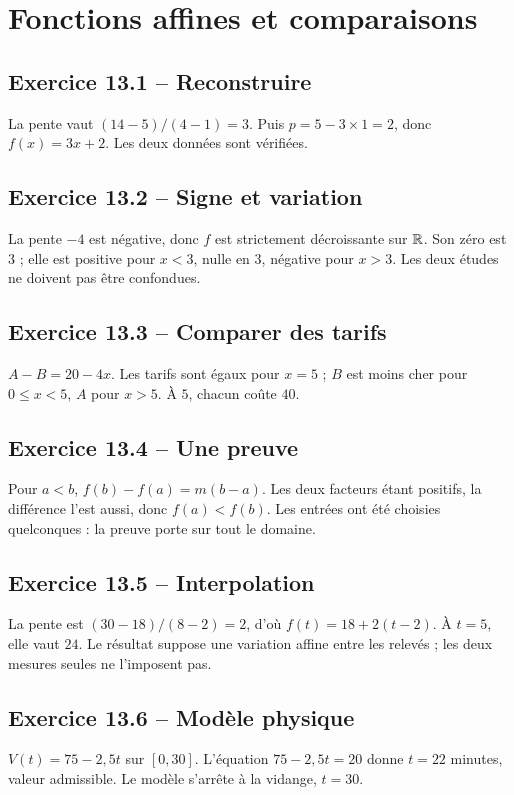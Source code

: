 \chapter{Fonctions affines et comparaisons}
\section*{Exercice 13.1 -- Reconstruire}
La pente vaut $(14-5)/(4-1)=3$. Puis $p=5-3\times1=2$, donc $f(x)=3x+2$. Les deux données sont vérifiées.

\section*{Exercice 13.2 -- Signe et variation}
La pente $-4$ est négative, donc $f$ est strictement décroissante sur $\mathbb{R}$. Son zéro est $3$ ; elle est positive pour $x<3$, nulle en $3$, négative pour $x>3$. Les deux études ne doivent pas être confondues.

\section*{Exercice 13.3 -- Comparer des tarifs}
$A-B=20-4x$. Les tarifs sont égaux pour $x=5$ ; $B$ est moins cher pour $0\leq x<5$, $A$ pour $x>5$. À $5$, chacun coûte $40$.

\section*{Exercice 13.4 -- Une preuve}
Pour $a<b$, $f(b)-f(a)=m(b-a)$. Les deux facteurs étant positifs, la différence l'est aussi, donc $f(a)<f(b)$. Les entrées ont été choisies quelconques : la preuve porte sur tout le domaine.

\section*{Exercice 13.5 -- Interpolation}
La pente est $(30-18)/(8-2)=2$, d'où $f(t)=18+2(t-2)$. À $t=5$, elle vaut $24$. Le résultat suppose une variation affine entre les relevés ; les deux mesures seules ne l'imposent pas.

\section*{Exercice 13.6 -- Modèle physique}
$V(t)=75-2{,}5t$ sur $[0,30]$. L'équation $75-2{,}5t=20$ donne $t=22$ minutes, valeur admissible. Le modèle s'arrête à la vidange, $t=30$.
